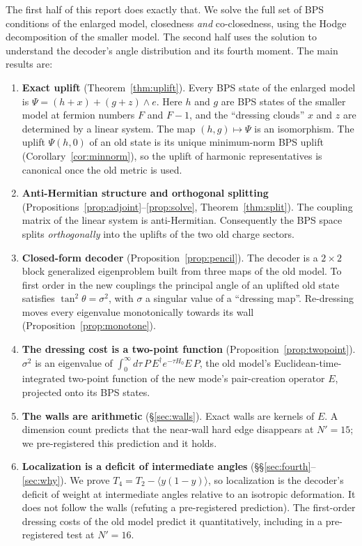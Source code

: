\documentclass[11pt]{article}
\newcommand{\Np}{N'}
\theoremstyle{plain}
\theoremstyle{remark}
\numberwithin{equation}{section}
\begin{document}
The first half of this report does exactly that. We solve the full set of BPS conditions of the enlarged model,
closedness \emph{and} co-closedness, using the Hodge decomposition of the smaller model. The second half uses the
solution to understand the decoder's angle distribution and its fourth moment. The main results are:
\begin{enumerate}\itemsep3pt
\item[(i)] \textbf{Exact uplift} (Theorem~\ref{thm:uplift}). Every BPS state of the enlarged model is
  $\Psi=(h+x)+(g+z)\wedge e$. Here $h$ and $g$ are BPS states of the smaller model at fermion numbers $F$ and $F-1$, and
  the ``dressing clouds'' $x$ and $z$ are determined by a linear system. The map $(h,g)\mapsto\Psi$ is an
  isomorphism. The uplift $\Psi(h,0)$ of an old state is its unique minimum-norm BPS uplift
  (Corollary~\ref{cor:minnorm}), so the uplift of harmonic representatives is canonical once the old metric is used.
\item[(ii)] \textbf{Anti-Hermitian structure and orthogonal splitting} (Propositions~\ref{prop:adjoint}--\ref{prop:solve},
  Theorem~\ref{thm:split}). The coupling matrix of the linear system is anti-Hermitian. Consequently the BPS space
  splits \emph{orthogonally} into the uplifts of the two old charge sectors.
\item[(iii)] \textbf{Closed-form decoder} (Proposition~\ref{prop:pencil}). The decoder is a $2\times2$ block
  generalized eigenproblem built from three maps of the old model. To first order in the new couplings the principal
  angle of an uplifted old state satisfies $\tan^2\theta=\sigma^2$, with $\sigma$ a singular value of a ``dressing
  map''. Re-dressing moves every eigenvalue monotonically towards its wall
  (Proposition~\ref{prop:monotone}).
\item[(iv)] \textbf{The dressing cost is a two-point function} (Proposition~\ref{prop:twopoint}). $\sigma^2$ is an
  eigenvalue of $\int_0^\infty d\tau\, P\,E^\dagger e^{-\tau H_0}E\,P$, the old model's Euclidean-time-integrated
  two-point function of the new mode's pair-creation operator $E$, projected onto its BPS states.
\item[(v)] \textbf{The walls are arithmetic} (\S\ref{sec:walls}). Exact walls are kernels of $E$. A dimension count
  predicts that the near-wall hard edge disappears at $\Np=15$; we pre-registered this prediction and it holds.
\item[(vi)] \textbf{Localization is a deficit of intermediate angles} (\S\S\ref{sec:fourth}--\ref{sec:why}). We prove
  $T_4=T_2-\langle y(1-y)\rangle$, so localization is the decoder's deficit of weight at intermediate angles relative to
  an isotropic deformation. It does not follow the walls (refuting a pre-registered prediction). The first-order dressing
  costs of the old model predict it quantitatively, including in a pre-registered test at $\Np=16$.
\end{enumerate}
\end{document}
